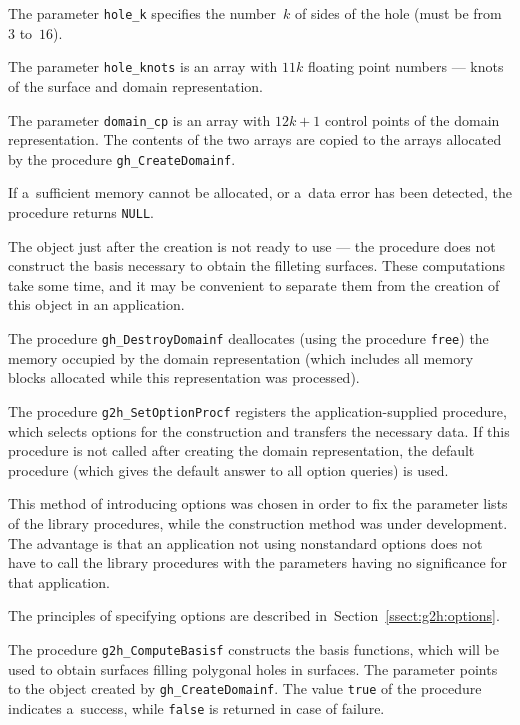 The parameter \texttt{hole\_k} specifies the number~$k$ of sides of the hole
(must be from $3$ to~$16$).

The parameter \texttt{hole\_knots} is an array with $11k$ floating point
numbers --- knots of the surface and domain representation.

The parameter \texttt{domain\_cp} is an array with $12k+1$ control points
of the domain representation. The contents of the two arrays are copied
to the arrays allocated by the procedure \texttt{gh\_CreateDomainf}.

If a~sufficient memory cannot be allocated, or a~data error has been detected,
the procedure returns \texttt{NULL}.

The object just after the creation is not ready to use --- the procedure
does not construct the basis necessary to obtain the filleting surfaces.
These computations take some time, and it may be convenient to separate
them from the creation of this object in an application.

\vspace{\medskipamount}
The procedure \texttt{gh\_DestroyDomainf} deallocates (using the procedure
\texttt{free}) the memory occupied by the domain representation (which
includes all memory blocks allocated while this representation was processed).


\vspace{\bigskipamount}
The procedure \texttt{g2h\_SetOptionProcf} registers the application-supplied
procedure, which selects options for the construction and transfers the
necessary data. If this procedure is not called after creating the domain
representation, the default procedure (which gives the default answer
to all option queries) is used.

This method of introducing options was chosen in order to fix the parameter
lists of the library procedures, while the construction method was under
development. The advantage is that an application not using nonstandard options
does not have to call the library procedures with the parameters having no
significance for that application.

The principles of specifying options are described
in~Section~\ref{ssect:g2h:options}.


\vspace{\bigskipamount}
The procedure \texttt{g2h\_ComputeBasisf} constructs the basis functions,
which will be used to obtain surfaces filling polygonal holes in surfaces.
The parameter points to the object created by \texttt{gh\_CreateDomainf}.
The value \texttt{true} of the procedure indicates a~success, while
\texttt{false} is returned in case of failure.

